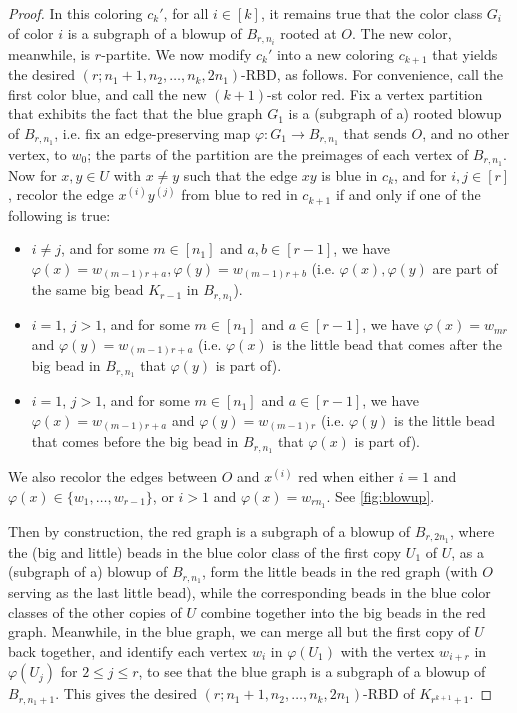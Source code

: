 \documentclass[reqno]{amsart}
\theoremstyle{remark}
\theoremstyle{definition}
\numberwithin{theorem}{section}
\renewcommand{\phi}{\varphi}
\renewcommand{\le}{\leqslant}
\begin{document}
\begin{proof}
    In this coloring $c_k'$, for all $i\in [k]$, it remains true that the color class $G_i$ of color $i$ is a subgraph of a blowup of $B_{r,n_i}$ rooted at $O$. The new color, meanwhile, is $r$-partite. We now modify $c_k'$ into a new coloring $c_{k+1}$ that yields the desired $(r;n_1+1,n_2,\dots,n_k,2n_1)$-RBD, as follows. For convenience, call the first color blue, and call the new $(k+1)$-st color red. Fix a vertex partition that exhibits the fact that the blue graph $G_1$ is a (subgraph of a) rooted blowup of $B_{r,n_1}$, i.e. fix an edge-preserving map $\phi: G_1 \to B_{r,n_1}$ that sends $O$, and no other vertex, to $w_0$; the parts of the partition are the preimages of each vertex of $B_{r,n_1}$. Now for $x,y\in U$ with $x\neq y$ such that the edge $xy$ is blue in $c_k$, and for $i,j\in [r]$, recolor the edge $x^{(i)}y^{(j)}$ from blue to red in $c_{k+1}$ if and only if one of the following is true:
    \begin{itemize}
        \item $i\neq j$, and for some $m\in [n_1]$ and $a,b\in [r-1]$, we have $\phi(x)=w_{(m-1)r+a}, \phi(y)=w_{(m-1)r+b}$ (i.e. $\phi(x),\phi(y)$ are part of the same big bead $K_{r-1}$ in $B_{r,n_1}$).
        \item $i=1$, $j>1$, and for some $m\in [n_1]$ and $a\in [r-1]$, we have $\phi(x)=w_{mr}$ and $\phi(y)=w_{(m-1)r+a}$ (i.e. $\phi(x)$ is the little bead that comes after the big bead in $B_{r,n_1}$ that $\phi(y)$ is part of).
        \item $i=1$, $j>1$, and for some $m\in [n_1]$ and $a\in [r-1]$, we have $\phi(x)=w_{(m-1)r+a}$ and $\phi(y)=w_{(m-1)r}$ (i.e. $\phi(y)$ is the little bead that comes before the big bead in $B_{r,n_1}$ that $\phi(x)$ is part of).
    \end{itemize}
    We also recolor the edges between $O$ and $x^{(i)}$ red when either $i=1$ and $\phi(x)\in \{w_1,\dots,w_{r-1}\}$, or $i>1$ and $\phi(x)=w_{rn_1}$. See \cref{fig:blowup}.



    Then by construction, the red graph is a subgraph of a blowup of $B_{r,2n_1}$, where the (big and little) beads in the blue color class of the first copy $U_1$ of $U$, as a (subgraph of a) blowup of $B_{r,n_1}$, form the little beads in the red graph (with $O$ serving as the last little bead), while the corresponding beads in the blue color classes of the other copies of $U$ combine together into the big beads in the red graph. Meanwhile, in the blue graph, we can merge all but the first copy of $U$ back together, and identify each vertex $w_{i}$ in $\phi(U_1)$ with the vertex $w_{i+r}$ in $\phi(U_j)$ for $2\le j\le r$, to see that the blue graph is a subgraph of a blowup of $B_{r,n_1+1}$. This gives the desired $(r;n_1+1,n_2,\dots,n_k,2n_1)$-RBD of $K_{r^{k+1}+1}$.
\end{proof}
\end{document}
